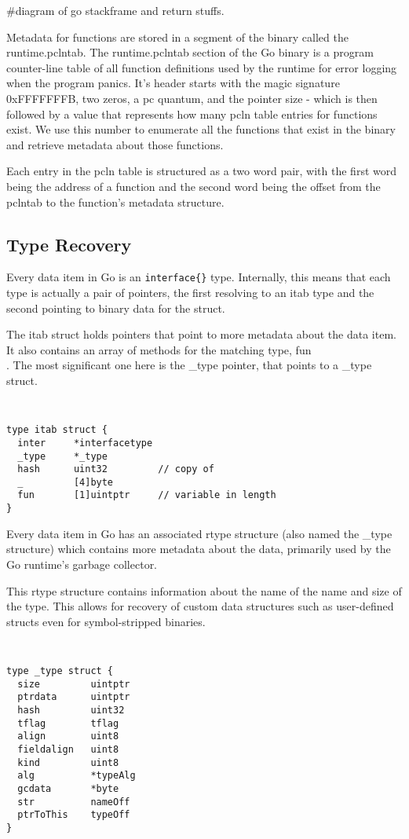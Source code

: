 \documentclass[letterpaper,twocolumn,10pt]{article}
\begin{document}
\#diagram of go stackframe and return stuffs.

Metadata for functions are stored in a segment of the binary called the runtime.pclntab. The runtime.pclntab section of the Go binary is a program counter-line table of all function definitions used by the runtime for error logging when the program panics. It’s header starts with the magic signature 0xFFFFFFFB, two zeros, a pc quantum, and the pointer size - which is then followed by a value that represents how many pcln table entries for functions exist. We use this number to enumerate all the functions that exist in the binary and retrieve metadata about those functions.

Each entry in the pcln table is structured as a two word pair, with the first word being the address of a function and the second word being the offset from the pclntab to the function’s metadata structure.

\subsection{Type Recovery}
Every data item in Go is an \texttt{interface\{\}} type. Internally, this means that each type is actually a pair of pointers, the first resolving to an itab type and the second pointing to binary data for the struct.

    The itab struct holds pointers that point to more metadata about the data item. It also contains an array of methods for the matching type, fun\[\]. The most significant one here is the \_type pointer, that points to a \_type struct. 

{\tt \small
\begin{verbatim}
type itab struct {
  inter     *interfacetype
  _type     *_type
  hash      uint32         // copy of
  _         [4]byte
  fun       [1]uintptr     // variable in length
}
\end{verbatim}
}

Every data item in Go has an associated rtype structure (also named the \_type structure) which contains more metadata about the data, primarily used by the Go runtime’s garbage collector.

This rtype structure contains information about the name of the name and size of the type. This allows for recovery of custom data structures such as user-defined structs even for symbol-stripped binaries. 
{\tt \small
\begin{verbatim}
type _type struct {
  size         uintptr
  ptrdata      uintptr 
  hash         uint32
  tflag        tflag
  align        uint8
  fieldalign   uint8
  kind         uint8
  alg          *typeAlg
  gcdata       *byte 
  str          nameOff
  ptrToThis    typeOff
}
\end{verbatim}
}
\end{document}
